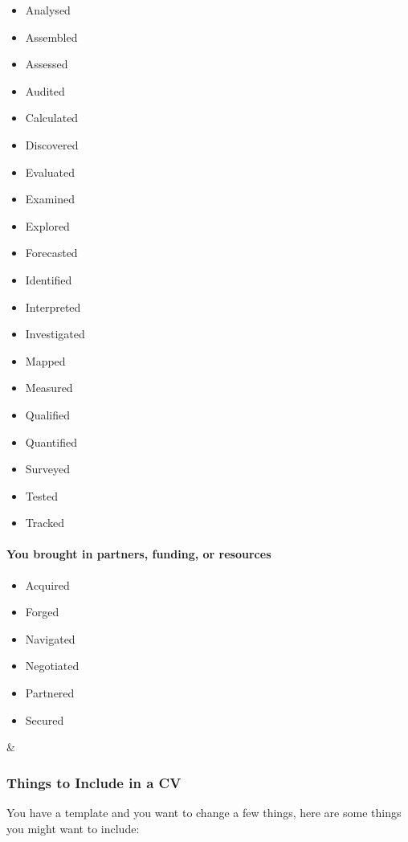 \documentclass{article}
\begin{document}
\begin{longtable}
\begin{minipage}[t]{0.47\columnwidth}
\begin{itemize}
\item
  Analysed
\item
  Assembled
\item
  Assessed
\item
  Audited
\item
  Calculated
\item
  Discovered
\item
  Evaluated
\item
  Examined
\item
  Explored
\item
  Forecasted
\item
  Identified
\item
  Interpreted
\item
  Investigated
\item
  Mapped
\item
  Measured
\item
  Qualified
\item
  Quantified
\item
  Surveyed
\item
  Tested
\item
  Tracked
\end{itemize}\strut
\end{minipage}\tabularnewline
\begin{minipage}[t]{0.47\columnwidth}\raggedright
\hypertarget{you-brought-in-partners-funding-or-resources}{%
\paragraph{You brought in partners, funding, or
resources}\label{you-brought-in-partners-funding-or-resources}}

\begin{itemize}
\item
  Acquired
\item
  Forged
\item
  Navigated
\item
  Negotiated
\item
  Partnered
\item
  Secured
\end{itemize}\strut
\end{minipage} & \begin{minipage}[t]{0.47\columnwidth}\raggedright
\strut
\end{minipage}\tabularnewline
\bottomrule
\end{longtable}

\subsubsection{Things to Include in a CV}
You have a template and you want to change a few things, here are some
things you might want to include:
\end{document}

